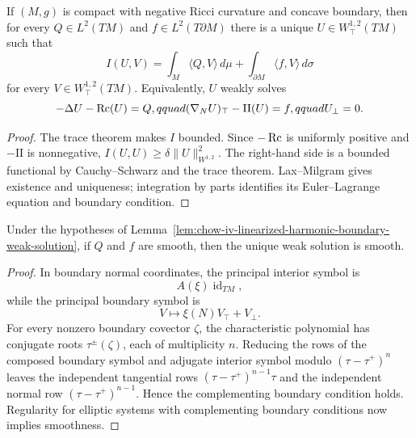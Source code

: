 \begin{lemma}
\label{lem:chow-iv-linearized-harmonic-boundary-weak-solution}
If \((M,g)\) is compact with negative Ricci curvature and concave boundary,
then for every \(Q\in L^2(TM)\) and \(f\in L^2(T\partial M)\) there is a unique
\(U\in W^{1,2}_{\top}(TM)\) such that
\[
 I(U,V)=\int_M\langle Q,V\rangle\,d\mu
       +\int_{\partial M}\langle f,V\rangle\,d\sigma
\]
for every \(V\in W^{1,2}_{\top}(TM)\).  Equivalently, \(U\) weakly solves
\[
 -\Delta U-\operatorname{Rc}(U)=Q,qquad
 (\nabla_NU)_{\top}-\mathrm{II}(U)=f,qquad U_\perp=0.
\]
\end{lemma}
\begin{proof}
The trace theorem makes \(I\) bounded.  Since \(-\operatorname{Rc}\) is uniformly positive
and \(-\mathrm{II}\) is nonnegative, \(I(U,U)\ge\delta\|U\|_{W^{1,2}}^2\).
The right-hand side is a bounded functional by Cauchy--Schwarz and the trace
theorem.  Lax--Milgram gives existence and uniqueness; integration by parts
identifies its Euler--Lagrange equation and boundary condition.
\end{proof}

\begin{lemma}
\label{lem:chow-iv-linearized-harmonic-boundary-regularity}
Under the hypotheses of Lemma~\ref{lem:chow-iv-linearized-harmonic-boundary-weak-solution},
if \(Q\) and \(f\) are smooth, then the unique weak solution is smooth.
\end{lemma}
\begin{proof}
In boundary normal coordinates, the principal interior symbol is
\[
 A(\xi)\operatorname{id}_{TM},
\]
while the principal boundary symbol is
\[
 V\longmapsto \xi(N)V_{\top}+V_\perp.
\]
For every nonzero boundary covector \(\zeta\), the characteristic polynomial
has conjugate roots \(\tau^\pm(\zeta)\), each of multiplicity \(n\).  Reducing
the rows of the composed boundary symbol and adjugate interior symbol modulo
\((\tau-\tau^+)^n\) leaves the independent tangential rows
\((\tau-\tau^+)^{n-1}\tau\) and the independent normal row
\((\tau-\tau^+)^{n-1}\).  Hence the complementing boundary condition holds.
Regularity for elliptic systems with complementing boundary conditions now
implies smoothness.
\end{proof}

